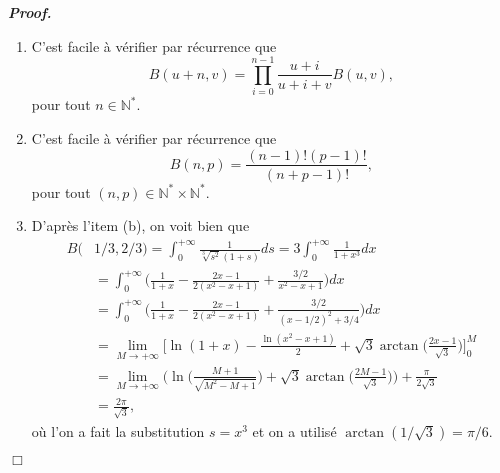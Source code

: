 \documentclass[11pt,a4paper]{article}
\newcommand{\NN}{\mathbb{N}}
\newenvironment{preuve}[1][]
{\vskip 2mm  \noindent\emph{\bf Proof#1. }}{$\Box$ \vskip 2mm}
\begin{document}
\begin{preuve}
\begin{enumerate}
			\item C'est facile à vérifier par récurrence que 
			\[     B(u+n,v) = \prod_{i=0}^{n-1} \frac{u+i}{u+i+v} B(u,v),      \]
			pour tout $n \in \NN^{*}$. 
			
			\item C'est facile à vérifier par récurrence que 
			\[     B(n,p) = \frac{(n-1)! (p-1)!}{(n+p-1)!},     \]
			pour tout $(n,p)\in \NN^{*}\times \NN^{*}$.  
			
			\item D'après l'item (b), on voit bien que
			\begin{align*}
			B(&1/3,2/3) = \int_0^{+\infty} \frac{1}{\sqrt[3]{s^{2}}(1+s)}ds = 3 \int_0^{+\infty} \frac{1}{1+x^{3}}dx 
			\\
			&= \int_0^{+\infty} \bigg( \frac{1}{1+x} - \frac{2x-1}{2(x^{2}-x+1)} + \frac{3/2}{x^{2}-x+1}  \bigg) dx 
			\\
			&= \int_0^{+\infty} \bigg( \frac{1}{1+x} - \frac{2x-1}{2(x^{2}-x+1)} + \frac{3/2}{(x-1/2)^{2}+3/4}  \bigg) dx 
			\\
			&= \underset{M \rightarrow + \infty}{\lim}\bigg[ \ln(1+x) - \frac{\ln(x^{2}-x+1)}{2} + \sqrt{3} \arctan\Big(\frac{2x-1}{\sqrt{3}}\Big)  \bigg]_{0}^{M}
			\\
			&= \underset{M \rightarrow + \infty}{\lim}\bigg( \ln\Big(\frac{M+1}{\sqrt{M^{2}-M+1}}\Big) + \sqrt{3} \arctan\Big(\frac{2M-1}{\sqrt{3}}\Big)  \bigg) + \frac{\pi}{2 \sqrt{3}}
			\\
			&= \frac{2 \pi}{\sqrt{3}},
			\end{align*}
			où l'on a fait la substitution $s = x^{3}$ et on a utilisé $\arctan(1/\sqrt{3}) = \pi/6$.  
		\end{enumerate}
	\end{preuve}
	
\end{document}
